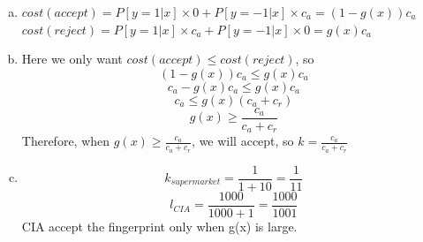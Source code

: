 \documentclass[11pt]{article}
\begin{document}
\newpage

\begin{enumerate} [(a)]
	\item $cost(accept)=P[y=1|x]\times 0 +P[y=-1|x]\times c_a = (1-g(x))c_a$\\$cost(reject)=P[y=1|x]\times c_a +P[y=-1|x]\times 0 =  g(x)c_a$

	\item Here we only want $cost(accept)\leq cost(reject)$, so\[
		(1-g(x))c_a \leq g(x)c_a
	\]\[
		c_a-g(x)c_a \leq g(x)c_a
	\]\[
		c_a \leq g(x)(c_a+c_r)
	\]\[
		g(x) \geq \frac{c_a}{c_a+c_r}
	\]
	Therefore, when $g(x) \geq \frac{c_a}{c_a+c_r}$, we will accept, so $k= \frac{c_a}{c_a+c_r}$

	\item \[
		k_{supermarket} = \frac{1}{1+10}=\frac{1}{11}
	\]\[
		l_{CIA} = \frac{1000}{1000+1} = \frac{1000}{1001}
	\]
	CIA accept the fingerprint only when g(x) is large.
\end{enumerate}
\end{document}
